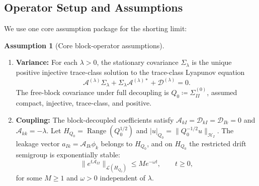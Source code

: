 \documentclass[preprint,12pt]{elsarticle}
\theoremstyle{plain}
\theoremstyle{definition}
\newtheorem{assumption}[theorem]{Assumption}
\theoremstyle{remark}
\begin{document}
    \subsection{Operator Setup and Assumptions}
    \label{sec:setup:assumptions}

    We use one core assumption package for the shorting limit:

    \begin{assumption}[Core block-operator assumptions]
        \label{assum:core_analytical}
        \begin{enumerate}[label=(\roman*)]
            \item[(i)] \textbf{Variance:} \label{assum:linear_second_moment}
            For each $\lambda>0$, the stationary covariance $\Sigma_\lambda$ is
            the unique positive injective trace-class solution to the trace-class
            Lyapunov equation
            \begin{equation}
                \label{eq:op_lyapunov}
                \mathcal{A}^{(\lambda)}\Sigma_\lambda + \Sigma_\lambda\mathcal{A}^{(\lambda)*} + \mathcal{D}^{(\lambda)} = 0.
            \end{equation}
            The free-block covariance under full decoupling is
            $Q_0\coloneqq\Sigma_{II}^{(0)}$, assumed compact, injective, trace-class,
            and positive.

            \item[(ii)] \textbf{Coupling:} \label{assum:cm_stability}
            The block-decoupled coefficients satisfy $\mathcal{A}_{kI}=\mathcal{D}_{kI}=\mathcal{D}_{Ik}=0$ and $\mathcal{A}_{kk}=-\lambda$.
            Let
            $H_{Q_0}=\operatorname{Range}(Q_0^{1/2})$ and
            $|u|_{Q_0}=\|Q_0^{-1/2}u\|_{\mathcal{H}_I}$. The leakage vector
            $a_{Ik}=\mathcal{A}_{Ik}\phi_k$ belongs to $H_{Q_0}$, and
            on $H_{Q_0}$ the restricted drift semigroup is exponentially stable:
            \begin{equation}
                \|e^{t\mathcal{A}_{II}}\|_{\mathcal{L}(H_{Q_0})} \le M e^{-\omega t},\qquad t\ge0,
            \end{equation}
            for some $M\ge1$ and $\omega>0$ independent of $\lambda$.
        \end{enumerate}
    \end{assumption}
\end{document}
